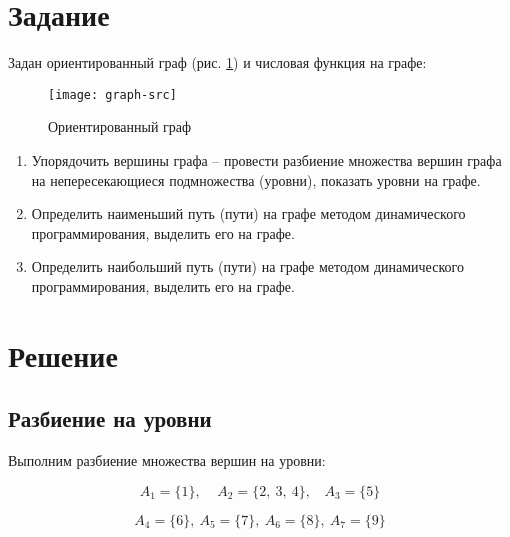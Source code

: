 





\section{Задание}

Задан ориентированный граф (рис. \ref{pic:graph-src}) и числовая функция на графе:

\begin{figure}[H]
\begin{center}
	\texttt{[image: graph-src]}
	\caption{Ориентированный граф}
	\label{pic:graph-src}
\end{center}
\end{figure}

\begin{enumerate}
	\item Упорядочить вершины графа – провести разбиение множества вершин графа на непересекающиеся подмножества (уровни), показать уровни на графе.
	
	\item Определить наименьший путь (пути) на графе методом динамического программирования, выделить его на графе.
	
	\item Определить наибольший путь (пути) на графе методом динамического программирования, выделить его на графе.
	
\end{enumerate}

\section{Решение}

\subsection{Разбиение на уровни}

Выполним разбиение множества вершин на уровни:

\begin{equation*}
	A_1 = \{1\},\ \ \ \ \ A_2 = \{2,\ 3,\ 4\},\ \ \ \ A_3 = \{5\}
\end{equation*}

\begin{equation*}
	A_4 = \{6\},\ A_5 = \{7\},\ A_6 = \{8\},\ A_7 = \{9\}
\end{equation*}

